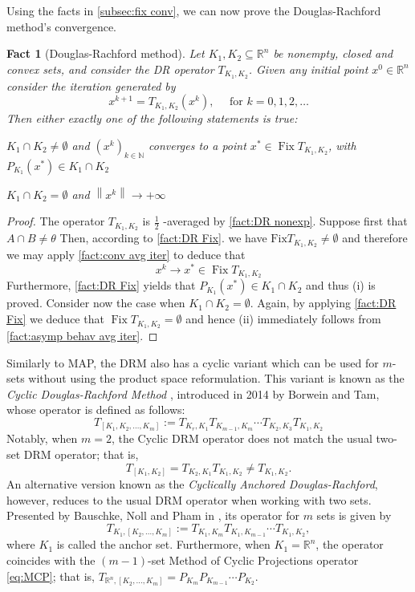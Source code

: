 \documentclass[smallextended,numbook,nospthms]{svjour3}
\theoremstyle{plain}
\newtheorem{fact}[theorem]{Fact}
\theoremstyle{definition}
\def\RR{\mathds R}
\def\NN{\mathds N}
\DeclareMathOperator{\Fix}{Fix}
\begin{document}
Using the facts in \cref{subsec:fix conv}, we can now prove the Douglas-Rachford method's convergence.
\begin{fact}[Douglas-Rachford method]\label{fact:DR conv}
Let $K_1, K_2 \subseteq \RR^n$ be nonempty, closed and convex sets, and consider the DR operator $T_{K_1, K_2}$. Given any initial point $x^{0} \in \RR^n$
consider the iteration generated by
\[
x^{k+1}=T_{K_1, K_2}\left(x^{k}\right), \quad \text { for } k=0,1,2, \dots
\]
Then either exactly one of the following statements is true:
\begin{listi}
\item $K_1 \cap K_2 \neq \emptyset$ and $\left(x^{k}\right)_{k \in \NN}$ converges to a point $x^{*} \in \Fix T_{K_1, K_2}$, with $P_{K_1}\left(x^{*}\right) \in K_1 \cap K_2$
\item $K_1 \cap K_2=\emptyset$ and $\left\|x^{k}\right\| \rightarrow+\infty$
\end{listi}
\end{fact}
\begin{proof}
The operator $T_{K_1, K_2}$ is $\frac{1}{2}$ -averaged by \cref{fact:DR nonexp}. Suppose first that $A \cap B \neq \theta$ Then, according to \cref{fact:DR Fix}. we have $\mathrm{Fix} T_{K_1, K_2} \neq \emptyset$ and therefore we may apply \cref{fact:conv avg iter} to deduce that
\[
x^{k} \rightarrow x^{*} \in \operatorname{Fix} T_{K_1, K_2}
\]
Furthermore, \cref{fact:DR Fix} yields that $P_{K_1}\left(x^{*}\right) \in K_1 \cap K_2$ and thus
(i) is proved. Consider now the case when $K_1 \cap K_2=\emptyset$. Again, by applying \cref{fact:DR Fix} we deduce that $\Fix T_{K_1, K_2}=\emptyset$ and hence
(ii) immediately follows from \cref{fact:asymp behav avg iter}.
\end{proof}

Similarly to MAP, the DRM also has a cyclic variant which can be used for $m$-sets without using the product space reformulation. This variant is known as the \emph{Cyclic Douglas-Rachford Method} \cite{Borwein:2014}, introduced in 2014 by Borwein and Tam, whose operator is defined as follows:
\[
T_{\left[K_{1}, K_{2}, \ldots, K_{m}\right]}:=T_{K_{r}, K_{1}} T_{K_{m-1}, K_{m}} \cdots T_{K_{2}, K_{3}} T_{K_{1}, K_{2}}
\]
Notably, when $m=2$, the Cyclic DRM operator does not match the usual two-set DRM operator; that is,
\[
T_{[K_1, K_2]}=T_{K_2, K_1} T_{K_1, K_2} \neq T_{K_1, K_2}.
\]
An alternative version known as the \emph{Cyclically Anchored Douglas-Rachford}, however, reduces to the usual DRM operator when working with two sets. Presented by Bauschke, Noll and Pham in \cite{Bauschke:2015df}, its operator for $m$ sets is given by
\[
T_{K_{1},\left[K_{2}, \ldots, K_{m}\right]}:=T_{K_{1}, K_{m}} T_{K_{1}, K_{m-1}} \cdots T_{K_{1}, K_{2}},
\]
where $K_{1}$ is called the anchor set. Furthermore, when $K_1=\RR^n$, the operator coincides with the $(m-1)$-set Method of Cyclic Projections operator \cref{eq:MCP}; that is, $T_{\RR^n,\left[K_{2}, \ldots, K_{m}\right]}=P_{K_{m}} P_{K_{m-1}} \cdots P_{K_{2}}$.
\end{document}
